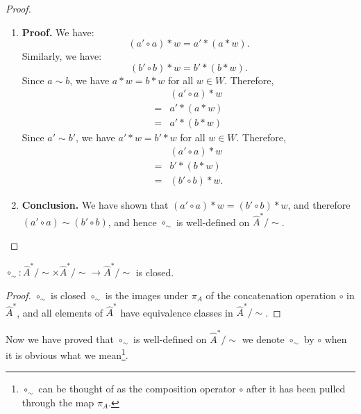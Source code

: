 \begin{proof}
\begin{enumerate}[(1)]
        \item \textbf{Proof.}
              We have:
              \begin{equation}
                  (a' \circ a) \ast w = a' \ast (a \ast w).
              \end{equation}
              Similarly, we have:
              \begin{equation}
                  (b' \circ b) \ast w = b' \ast (b \ast w).
              \end{equation}
              Since $a \sim b$, we have $a \ast w = b \ast w$ for all $w \in W$.
              Therefore,
              \begin{align}
                      & (a' \circ a) \ast w \\
                  ={} & a' \ast (a \ast w)  \\
                  ={} & a' \ast (b \ast w)
              \end{align}
              Since $a' \sim b'$, we have $a' \ast w = b' \ast w$ for all $w \in W$.
              Therefore,
              \begin{align}
                      & (a' \circ a) \ast w  \\
                  ={} & b' \ast (b \ast w)   \\
                  ={} & (b' \circ b) \ast w.
              \end{align}


        \item \textbf{Conclusion.}
              We have shown that $(a' \circ a) \ast w = (b' \circ b) \ast w$, and therefore $(a' \circ a) \sim (b' \circ b)$, and hence $\circ_{\sim}$ is well-defined on $\hat{A}^{\ast}/\sim$.
    \end{enumerate}

\end{proof}

\begin{proposition}\label{prp:circ_sim_closed}
    $\circ_{\sim}: \hat{A}^{\ast}/\sim \times \hat{A}^{\ast}/\sim \to \hat{A}^{\ast}/\sim$ is closed.
\end{proposition}
\begin{proof}
    $\circ_{\sim}$ is closed $\circ_{\sim}$ is the images under $\pi_{A}$ of the concatenation operation $\circ$ in $\hat{A}^{\ast}$, and all elements of $\hat{A}^{\ast}$ have equivalence classes in $\hat{A}^{\ast}/\sim$.
\end{proof}


Now we have proved that $\circ_{\sim}$ is well-defined on $\hat{A}^{\ast}/\sim$ we denote $\circ_{\sim}$ by $\circ$ when it is obvious what we mean\footnote{$\circ_{\sim}$ can be thought of as the composition operator $\circ$ after it has been pulled through the map $\pi_{A}$.}.

